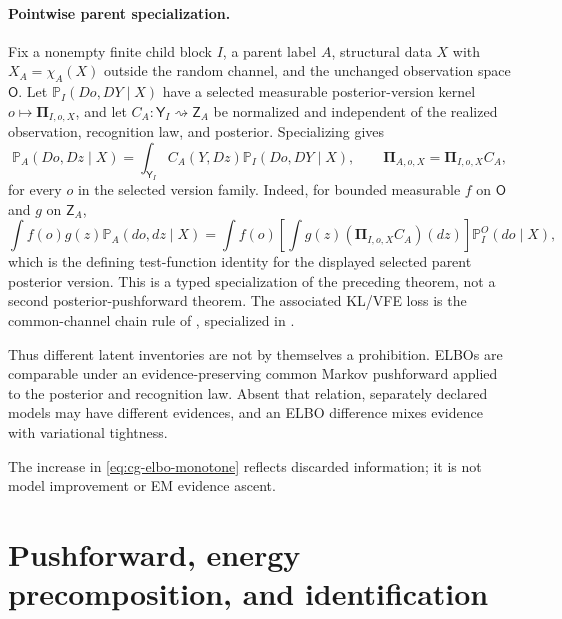 \paragraph{Pointwise parent specialization.}
Fix a nonempty finite child block $I$, a parent label $A$, structural data $X$ with
$X_A=\chi_A(X)$ outside the random channel, and the unchanged observation space $\mathsf O$.
Let $\mathbb P_I(Do,DY\mid X)$ have a selected measurable posterior-version kernel
$o\mapsto\boldsymbol\Pi_{I,o,X}$, and let
$C_A:\mathsf Y_I\rightsquigarrow\mathsf Z_A$ be normalized and independent of the realized
observation, recognition law, and posterior. Specializing
 gives
\begin{equation}
\mathbb P_A(Do,Dz\mid X)
=\int_{\mathsf Y_I}C_A(Y,Dz)\mathbb P_I(Do,DY\mid X),
\qquad
\boldsymbol\Pi_{A,o,X}=\boldsymbol\Pi_{I,o,X}C_A,
\label{eq:cg-pointwise-parent-posterior}
\end{equation}
for every $o$ in the selected version family. Indeed, for bounded measurable $f$ on
$\mathsf O$ and $g$ on $\mathsf Z_A$,
\begin{equation}
\int f(o)g(z)\mathbb P_A(do,dz\mid X)
=\int f(o)\left[\int g(z)(\boldsymbol\Pi_{I,o,X}C_A)(dz)\right]
\mathbb P_I^O(do\mid X),
\label{eq:cg-pointwise-parent-posterior-test}
\end{equation}
which is the defining test-function identity for the displayed selected parent posterior version.
This is a typed specialization of the preceding theorem, not a second posterior-pushforward theorem.
The associated KL/VFE loss is the common-channel chain rule of
, specialized in
. 

Thus different latent inventories are not by themselves a prohibition.
ELBOs are comparable under an evidence-preserving common Markov pushforward
applied to the posterior and recognition law. Absent that relation,
separately declared models may have different evidences, and an ELBO
difference mixes evidence with variational tightness. 

The increase in \eqref{eq:cg-elbo-monotone} reflects discarded information;
it is not model improvement or EM evidence ascent. 

\section{Pushforward, energy precomposition, and identification}
\label{sec:cg-three-operations}

